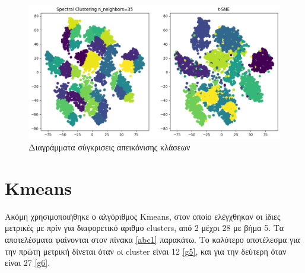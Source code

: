 \begin{figure}[ht]
	\centering
	\includegraphics[width=1\linewidth]{Imagedata1/n_35tsne.png}
	\caption{ Διαγράμματα σύγκρισεις απεικόνισης κλάσεων }
	\label{f:g4}	
\end{figure}
\section{Kmeans}
Ακόμη χρησιμοποιήθηκε ο αλγόριθμος Kmeans, στον οποίο ελέγχθηκαν οι ίδιες μετρικές με πρίν για διαφορετικό αριθμο clusters, από 2 μέχρι 28 με βήμα 5. Τα αποτελέσματα φαίνονται στον πίνακα \ref{abc1} παρακάτω. Το καλύτερο αποτέλεσμα για την πρώτη μετρική δίνεται όταν oι cluster είναι 12 \ref{g5}, και για την δεύτερη όταν είναι 27 \ref{g6}.

